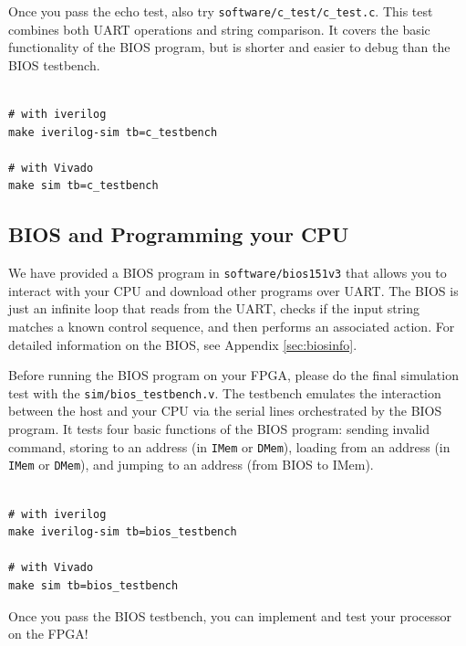 \documentclass[11pt]{article}
\begin{document}
Once you pass the echo test, also try \verb|software/c_test/c_test.c|. This test combines both UART operations and string comparison. It covers the basic functionality of the BIOS program, but is shorter and easier to debug than the BIOS testbench.

\begin{verbatim}

# with iverilog
make iverilog-sim tb=c_testbench

# with Vivado
make sim tb=c_testbench
\end{verbatim}

\subsection{BIOS and Programming your CPU}
\label{bios_info}

We have provided a BIOS program in \verb|software/bios151v3| that allows you to interact with your CPU and download other programs over UART.
The BIOS is just an infinite loop that reads from the UART, checks if the input string matches a known control sequence, and then performs an associated action.
For detailed information on the BIOS, see Appendix \ref{sec:biosinfo}.

Before running the BIOS program on your FPGA, please do the final simulation test with the \verb|sim/bios_testbench.v|. The testbench emulates the interaction between the host and your CPU via the serial lines orchestrated by the BIOS program. It tests four basic functions of the BIOS program: sending invalid command, storing to an address (in \texttt{IMem} or \texttt{DMem}), loading from an address (in \texttt{IMem} or \texttt{DMem}), and jumping to an address (from BIOS to IMem).

\begin{verbatim}

# with iverilog
make iverilog-sim tb=bios_testbench

# with Vivado
make sim tb=bios_testbench
\end{verbatim}

Once you pass the BIOS testbench, you can implement and test your processor on the FPGA!
\end{document}
